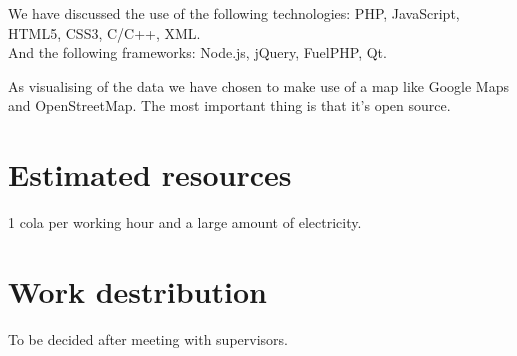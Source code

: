 \documentclass[10pt,a4paper]{article}
\begin{document}
We have discussed the use of the following technologies: PHP, JavaScript, HTML5, CSS3, C/C++, XML.\\
And the following frameworks: Node.js, jQuery, FuelPHP, Qt.

As visualising of the data we have chosen to make use of a map like Google Maps and OpenStreetMap. The most important thing is that it's open source. 

\section{Estimated resources}
1 cola per working hour and a large amount of electricity.



\section{Work destribution}
To be decided after meeting with supervisors.
\end{document}
